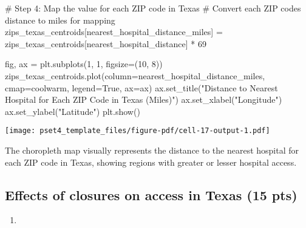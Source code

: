 \documentclass[
  letterpaper,
  DIV=11,
  numbers=noendperiod]{scrartcl}
\newenvironment{Shaded}{\begin{snugshade}}{\end{snugshade}}
\newcommand{\CommentTok}[1]{\textcolor[rgb]{0.37,0.37,0.37}{#1}}
\newcommand{\DecValTok}[1]{\textcolor[rgb]{0.68,0.00,0.00}{#1}}
\newcommand{\NormalTok}[1]{\textcolor[rgb]{0.00,0.23,0.31}{#1}}
\newcommand{\OperatorTok}[1]{\textcolor[rgb]{0.37,0.37,0.37}{#1}}
\newcommand{\StringTok}[1]{\textcolor[rgb]{0.13,0.47,0.30}{#1}}
\newcommand{\VariableTok}[1]{\textcolor[rgb]{0.07,0.07,0.07}{#1}}
\providecommand{\tightlist}{%
  \setlength{\itemsep}{0pt}\setlength{\parskip}{0pt}}\usepackage{longtable,booktabs,array}
\begin{document}
\begin{Shaded}
\begin{Highlighting}[]
\CommentTok{\# Step 4: Map the value for each ZIP code in Texas}
\CommentTok{\# Convert each ZIP code\textquotesingle{}s distance to miles for mapping}
\NormalTok{zips\_texas\_centroids[}\StringTok{\textquotesingle{}nearest\_hospital\_distance\_miles\textquotesingle{}}\NormalTok{] }\OperatorTok{=}\NormalTok{ zips\_texas\_centroids[}\StringTok{\textquotesingle{}nearest\_hospital\_distance\textquotesingle{}}\NormalTok{] }\OperatorTok{*} \DecValTok{69}

\NormalTok{fig, ax }\OperatorTok{=}\NormalTok{ plt.subplots(}\DecValTok{1}\NormalTok{, }\DecValTok{1}\NormalTok{, figsize}\OperatorTok{=}\NormalTok{(}\DecValTok{10}\NormalTok{, }\DecValTok{8}\NormalTok{))}
\NormalTok{zips\_texas\_centroids.plot(column}\OperatorTok{=}\StringTok{\textquotesingle{}nearest\_hospital\_distance\_miles\textquotesingle{}}\NormalTok{, cmap}\OperatorTok{=}\StringTok{\textquotesingle{}coolwarm\textquotesingle{}}\NormalTok{, legend}\OperatorTok{=}\VariableTok{True}\NormalTok{, ax}\OperatorTok{=}\NormalTok{ax)}
\NormalTok{ax.set\_title(}\StringTok{"Distance to Nearest Hospital for Each ZIP Code in Texas (Miles)"}\NormalTok{)}
\NormalTok{ax.set\_xlabel(}\StringTok{"Longitude"}\NormalTok{)}
\NormalTok{ax.set\_ylabel(}\StringTok{"Latitude"}\NormalTok{)}
\NormalTok{plt.show()}
\end{Highlighting}
\end{Shaded}

\texttt{[image: pset4\_template\_files/figure-pdf/cell-17-output-1.pdf]}

The choropleth map visually represents the distance to the nearest
hospital for each ZIP code in Texas, showing regions with greater or
lesser hospital access.

\subsection{Effects of closures on access in Texas (15
pts)}\label{effects-of-closures-on-access-in-texas-15-pts}

\begin{enumerate}
\def\labelenumi{\arabic{enumi}.}
\tightlist
\item
\end{enumerate}
\end{document}
